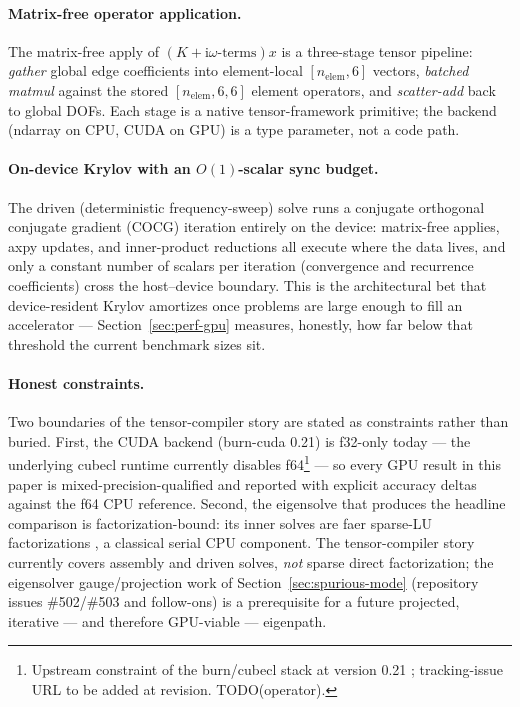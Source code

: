 \documentclass{anvil-paper}
\begin{document}
\paragraph{Matrix-free operator application.}
The matrix-free apply of $(K + \mathrm{i}\omega\text{-terms})x$ is a
three-stage tensor pipeline: \emph{gather} global edge coefficients into
element-local $[n_{\mathrm{elem}},6]$ vectors, \emph{batched matmul}
against the stored $[n_{\mathrm{elem}},6,6]$ element operators, and
\emph{scatter-add} back to global DOFs. Each stage is a native
tensor-framework primitive; the backend (ndarray on CPU, CUDA on GPU)
is a type parameter, not a code path.

\paragraph{On-device Krylov with an $O(1)$-scalar sync budget.}
The driven (deterministic frequency-sweep) solve runs a conjugate
orthogonal conjugate gradient (COCG) iteration entirely on the device:
matrix-free applies, axpy updates, and inner-product reductions all
execute where the data lives, and only a constant number of scalars per
iteration (convergence and recurrence coefficients) cross the host--device
boundary. This is the architectural bet that device-resident Krylov
amortizes once problems are large enough to fill an accelerator ---
Section~\ref{sec:perf-gpu} measures, honestly, how far below that
threshold the current benchmark sizes sit.

\paragraph{Honest constraints.}
Two boundaries of the tensor-compiler story are stated as constraints
rather than buried. First, the CUDA backend (burn-cuda 0.21) is f32-only
today --- the underlying cubecl runtime currently disables
f64\footnote{Upstream constraint of the burn/cubecl stack at version 0.21
\citep{burn}; tracking-issue URL to be added at revision.
TODO(operator).} --- so every GPU result in this paper is
mixed-precision-qualified and reported with explicit accuracy deltas
against the f64 CPU reference. Second, the eigensolve that produces the
headline comparison is factorization-bound: its inner solves are faer
sparse-LU factorizations \citep{kazdadi2026faer}, a classical serial CPU
component. The tensor-compiler story currently covers assembly and driven
solves, \emph{not} sparse direct factorization; the eigensolver
gauge/projection work of Section~\ref{sec:spurious-mode} (repository
issues \#502/\#503 and follow-ons) is a prerequisite for a future
projected, iterative --- and therefore GPU-viable --- eigenpath.
\end{document}
